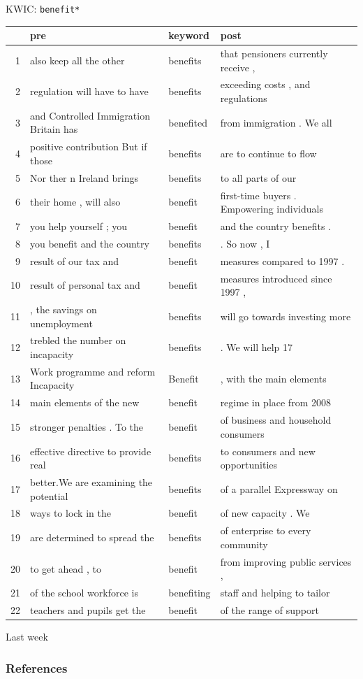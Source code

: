 \documentclass{hertieteaching}
\begin{document}
\begin{frame}{KWIC: \texttt{benefit*}}
\protect\hypertarget{kwic-benefit}{}

\tiny
\begin{table}[ht]
\centering
\begin{tabular}{rlll}
  \hline
 & pre & keyword & post \\ 
  \hline
1 & also keep all the other & benefits & that pensioners currently receive , \\ 
  2 & regulation will have to have & benefits & exceeding costs , and regulations \\ 
  3 & and Controlled Immigration Britain has & benefited & from immigration . We all \\ 
  4 & positive contribution But if those & benefits & are to continue to flow \\ 
  5 & Nor ther n Ireland brings & benefits & to all parts of our \\ 
  6 & their home , will also & benefit & first-time buyers . Empowering individuals \\ 
  7 & you help yourself ; you & benefit & and the country benefits . \\ 
  8 & you benefit and the country & benefits & . So now , I \\ 
  9 & result of our tax and & benefit & measures compared to 1997 . \\ 
  10 & result of personal tax and & benefit & measures introduced since 1997 , \\ 
  11 & , the savings on unemployment & benefits & will go towards investing more \\ 
  12 & trebled the number on incapacity & benefits & . We will help 17 \\ 
  13 & Work programme and reform Incapacity & Benefit & , with the main elements \\ 
  14 & main elements of the new & benefit & regime in place from 2008 \\ 
  15 & stronger penalties . To the & benefit & of business and household consumers \\ 
  16 & effective directive to provide real & benefits & to consumers and new opportunities \\ 
  17 & better.We are examining the potential & benefits & of a parallel Expressway on \\ 
  18 & ways to lock in the & benefit & of new capacity . We \\ 
  19 & are determined to spread the & benefits & of enterprise to every community \\ 
  20 & to get ahead , to & benefit & from improving public services , \\ 
  21 & of the school workforce is & benefiting & staff and helping to tailor \\ 
  22 & teachers and pupils get the & benefit & of the range of support \\ 
   \hline
\end{tabular}
\end{table}
\normalsize

\end{frame}



\begin{frame}{Last week}
\end{frame}

\begin{frame}[allowframebreaks]
\frametitle{References}
\printbibliography	
\end{frame}
\end{document}
